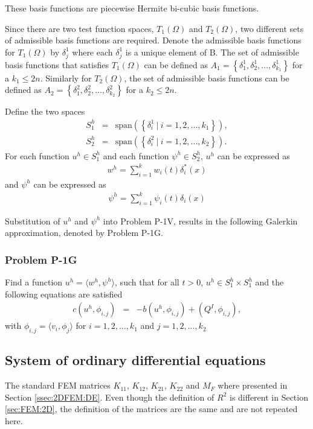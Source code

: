 \documentclass[../../main.tex]{subfiles}
\begin{document}
These basis functions are piecewise Hermite bi-cubic basis functions.

Since there are two test function spaces, $T_1(\Omega)$ and $T_2(\Omega)$, two different sets of admissible basis functions are required. Denote the admissible basis functions for $T_1(\Omega)$ by $\delta^1_j$ where each $\delta^1_j$ is a unique element of B. The set of admissible basis functions that satisfies $T_1(\Omega)$ can be defined as $A_1 = \left\{\delta^1_1, \delta^1_2,..., \delta^1_{k_1} \right\}$ for a $k_1 \leq 2n$. Similarly for $T_2(\Omega)$, the set of admissible basis functions can be defined as $A_2 = \left\{\delta^2_1, \delta^2_2,..., \delta^2_{k_2} \right\}$ for a $k_2 \leq 2n$.

Define the two spaces
\begin{eqnarray*}
	S^h_1 & = & \textrm{span}\left(\left\{\delta^1_i \ | \ i = 1,2,...,k_1 \right\} \right),\\
	S^h_2 & = & \textrm{span}\left(\left\{\delta^2_i \ | \ i = 1,2,...,k_2 \right\} \right).
\end{eqnarray*}
For each function $u^h \in S_1^h$ and each function $\psi^h \in S_2^h$, $u^h$ can be expressed as
\begin{eqnarray*}
	w^h = \sum_{i = 1}^{k} w_i(t) \delta^*_{i}(x)
\end{eqnarray*} and $\psi^h$ can be expressed as
\begin{eqnarray*}
	\psi^h = \sum_{i = 1}^{k} \psi_i(t) \delta_{i}(x)
\end{eqnarray*}

Substitution of $u^h$ and $\psi^h$ into Problem P-1V, results in the following Galerkin approximation, denoted by Problem P-1G.

\subsubsection{Problem P-1G}
Find a function $u^h = \langle w^h, \psi^h \rangle$, such that for all $t>0$, $u^h \in S_1^h \times S_1^h$ and the following equations are satisfied
\begin{eqnarray}
	c(u^h,\phi_{i,j}) &=& -b(u^h,\phi_{i,j}) + (Q^I,\phi_{i,j}), \label{eq:P_Model:ProblemP1V1}
\end{eqnarray} with $\phi_{i,j} = \langle v_i, \phi_j \rangle$ for $i = 1,2,...,k_1$ and $j = 1,2,...,k_2$

\subsection{System of ordinary differential equations}\label{plate_fem_g}
The standard FEM matrices $K_{11}$, $K_{12}$, $K_{21}$, $K_{22}$ and $M_F$ where presented in Section \ref{ssec:2DFEM:DE}. Even though the definition of $R^2$ is different in Section \ref{sec:FEM:2D}, the definition of the matrices are the same and are not repeated here.
\end{document}
